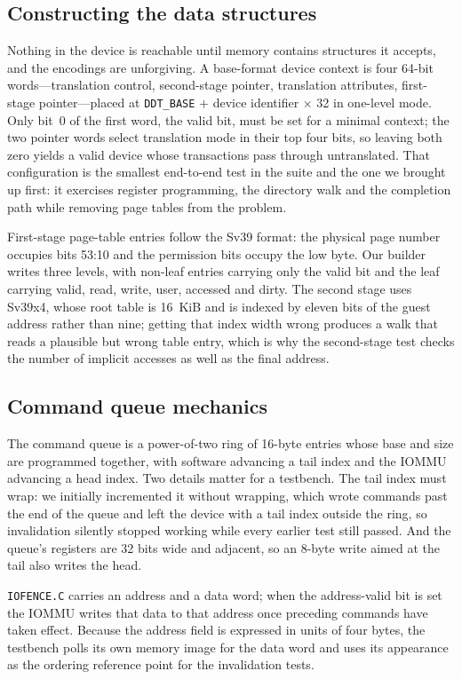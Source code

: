 \documentclass[journal]{IEEEtran}
\newcommand{\cmd}[1]{\mbox{\texttt{#1}}}
\begin{document}
\subsection{Constructing the data structures}
Nothing in the device is reachable until memory contains structures it accepts,
and the encodings are unforgiving. A base-format device context is four 64-bit
words---translation control, second-stage pointer, translation attributes,
first-stage pointer---placed at \texttt{DDT\_BASE} $+$ device identifier
$\times$ 32 in one-level mode. Only bit~0 of the first word, the valid bit, must
be set for a minimal context; the two pointer words select translation mode in
their top four bits, so leaving both zero yields a valid device whose
transactions pass through untranslated. That configuration is the smallest
end-to-end test in the suite and the one we brought up first: it exercises
register programming, the directory walk and the completion path while removing
page tables from the problem.

First-stage page-table entries follow the Sv39 format: the physical page number
occupies bits 53:10 and the permission bits occupy the low byte. Our builder
writes three levels, with non-leaf entries carrying only the valid bit and the
leaf carrying valid, read, write, user, accessed and dirty. The second stage
uses Sv39x4, whose root table is 16~KiB and is indexed by eleven bits of the
guest address rather than nine; getting that index width wrong produces a walk
that reads a plausible but wrong table entry, which is why the second-stage test
checks the number of implicit accesses as well as the final address.

\subsection{Command queue mechanics}
The command queue is a power-of-two ring of 16-byte entries whose base and size
are programmed together, with software advancing a tail index and the IOMMU
advancing a head index. Two details matter for a testbench. The tail index must
wrap: we initially incremented it without wrapping, which wrote commands past
the end of the queue and left the device with a tail index outside the ring, so
invalidation silently stopped working while every earlier test still passed.
And the queue's registers are 32 bits wide and adjacent, so an 8-byte write
aimed at the tail also writes the head.

\cmd{IOFENCE.C} carries an address and a data word; when the address-valid
bit is set the IOMMU writes that data to that address once preceding commands
have taken effect. Because the address field is expressed in units of four
bytes, the testbench polls its own memory image for the data word and uses its
appearance as the ordering reference point for the invalidation tests.
\end{document}

